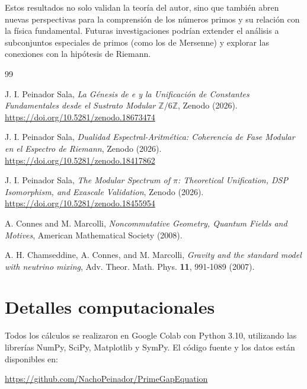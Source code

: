 \documentclass[12pt,a4paper]{article}
\theoremstyle{plain}
\theoremstyle{definition}
\theoremstyle{remark}
\begin{document}
Estos resultados no solo validan la teoría del autor, sino que también abren nuevas perspectivas para la comprensión de los números primos y su relación con la física fundamental. Futuras investigaciones podrían extender el análisis a subconjuntos especiales de primos (como los de Mersenne) y explorar las conexiones con la hipótesis de Riemann.

\begin{thebibliography}{99}

J. I. Peinador Sala, \textit{La Génesis de e y la Unificación de Constantes Fundamentales desde el Sustrato Modular $\mathbb{Z}/6\mathbb{Z}$}, Zenodo (2026). \url{https://doi.org/10.5281/zenodo.18673474}

J. I. Peinador Sala, \textit{Dualidad Espectral-Aritmética: Coherencia de Fase Modular en el Espectro de Riemann}, Zenodo (2026). \url{https://doi.org/10.5281/zenodo.18417862}

J. I. Peinador Sala, \textit{The Modular Spectrum of $\pi$: Theoretical Unification, DSP Isomorphism, and Exascale Validation}, Zenodo (2026). \url{https://doi.org/10.5281/zenodo.18455954}

A. Connes and M. Marcolli, \textit{Noncommutative Geometry, Quantum Fields and Motives}, American Mathematical Society (2008).

A. H. Chamseddine, A. Connes, and M. Marcolli, \textit{Gravity and the standard model with neutrino mixing}, Adv. Theor. Math. Phys. \textbf{11}, 991-1089 (2007).

\end{thebibliography}

\appendix

\section{Detalles computacionales}

Todos los cálculos se realizaron en Google Colab con Python 3.10, utilizando las librerías NumPy, SciPy, Matplotlib y SymPy. El código fuente y los datos están disponibles en:
\begin{center}
\url{https://github.com/NachoPeinador/PrimeGapEquation}
\end{center}
\end{document}
